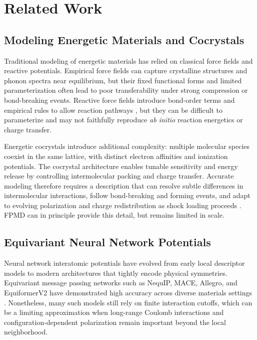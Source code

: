\section{Related Work}
\label{sec:related}

\subsection{Modeling Energetic Materials and Cocrystals}

Traditional modeling of energetic materials has relied on classical force fields and reactive potentials. Empirical force fields can capture crystalline structures and phonon spectra near equilibrium, but their fixed functional forms and limited parameterization often lead to poor transferability under strong compression or bond-breaking events. Reactive force fields introduce bond-order terms and empirical rules to allow reaction pathways \cite{van2001reaxff}, but they can be difficult to parameterize and may not faithfully reproduce \emph{ab initio} reaction energetics or charge transfer.

Energetic cocrystals introduce additional complexity: multiple molecular species coexist in the same lattice, with distinct electron affinities and ionization potentials. The cocrystal architecture enables tunable sensitivity and energy release by controlling intermolecular packing and charge transfer. Accurate modeling therefore requires a description that can resolve subtle differences in intermolecular interactions, follow bond-breaking and forming events, and adapt to evolving polarization and charge redistribution as shock loading proceeds \cite{valeeswaran2023charge,iosipescu2001experimental}. FPMD can in principle provide this detail, but remains limited in scale.

\subsection{Equivariant Neural Network Potentials}

Neural network interatomic potentials have evolved from early local descriptor models to modern architectures that tightly encode physical symmetries. Equivariant message passing networks such as NequIP, MACE, Allegro, and EquiformerV2 have demonstrated high accuracy across diverse materials settings \cite{batzner20223,batatia2022mace,kovacs2023mace,musaelian2023learning,liao2023equiformer}. Nonetheless, many such models still rely on finite interaction cutoffs, which can be a limiting approximation when long-range Coulomb interactions and configuration-dependent polarization remain important beyond the local neighborhood.

